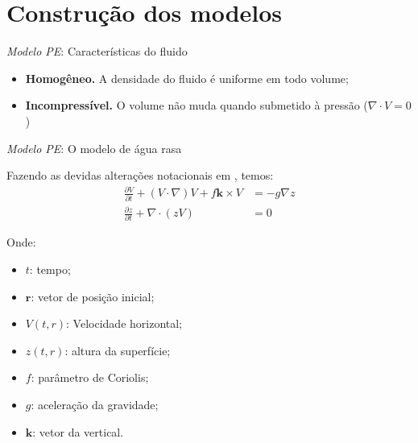\section{Construção dos modelos} 


\begin{frame}{\textit{Modelo PE}: Características do fluido}
	\begin{itemize}
		\item \textbf{Homogêneo.} A densidade do fluido é uniforme em todo volume;
		\item \textbf{Incompressível.} O volume não muda quando submetido à pressão ($\nabla \cdot V = 0$)
	\end{itemize}
\end{frame}


\begin{frame}{\textit{Modelo PE}: O modelo de água rasa}
		
	Fazendo as devidas alterações notacionais em \cite{salmon1998}, temos:
	\begin{align}
		\frac{\partial V}{\partial t} + (V \cdot \nabla)V + f \mathbf{k} \times V & = -g \nabla z \label{eq:agua-rasa-1} \\
		\frac{\partial z}{\partial t} + \nabla \cdot (z V)                        & = 0 \label{eq:agua-rasa-2}           
	\end{align}
		
	\begin{small}
		Onde:
		\begin{multicols}{2}
			\begin{itemize}
				\item $t$: tempo;
				\item $\mathbf{r}$: vetor de posição inicial;
				\item $V(t,r)$: Velocidade horizontal;
				\item $z(t,r)$: altura da superfície;
				\item $f$: parâmetro de Coriolis;
				\item $g$: aceleração da gravidade;
				\item $\mathbf{k}$: vetor da vertical.
			\end{itemize}
		\end{multicols}
	\end{small}
\end{frame}


